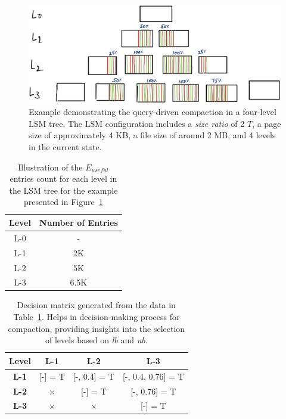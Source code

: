 \begin{figure}
    \includegraphics[scale=0.2]{Figures/first-state-lsm.jpg}
    \caption{Example demonstrating the query-driven compaction in a four-level LSM tree. The 
    LSM configuration includes a \textit{size ratio} of 2 \(T\), a page size of approximately 4 KB, a file size of around 
    2 MB, and 4 levels in the current state.}\label{fig:first-state-lsm}
\end{figure}

\begin{table}
    \begin{tabular}{|c|c|}
        \hline
        \textbf{Level} & \textbf{Number of Entries} \\
        \hline
        L-0 & \-- \\
        \hline
        L-1 & 2K \\
        \hline
        L-2 & 5K \\
        \hline
        L-3 & 6.5K \\
        \hline
    \end{tabular}
    \caption{Illustration of the \textit{$E_{useful}$} entries count for each level in the LSM tree for
    the example presented in Figure~\ref{fig:first-state-lsm}}
    \label{table:ex-decision-making-meta-data}
\end{table}

\begin{table}
    \begin{tabular}{ |c|c|c|c| }
        \hline
        \textbf{Level} & \textbf{L-1} & \hspace*{4.1mm}\textbf{L-2}\hspace*{4.1mm} & \hspace*{4.1mm}\textbf{L-3}\hspace*{4.1mm} \\
        \hline
        \textbf{L-1} & [-] = T & [-, 0.4] = T & [-, 0.4, 0.76] = T \\
        \hline
        \textbf{L-2} & $\times$ & [-] = T & [-, 0.76] = T \\
        \hline
        \textbf{L-3} &  $\times$ &  $\times$ & [-] = T \\
        \hline
    \end{tabular}
    \caption{Decision matrix generated from the data in Table~\ref{table:ex-decision-making-meta-data}. Helps in 
    decision-making process for compaction, providing insights into the selection of levels based on \textit{lb} and \textit{ub}.}
    \label{table:ex-decision-matrix}
\end{table}


